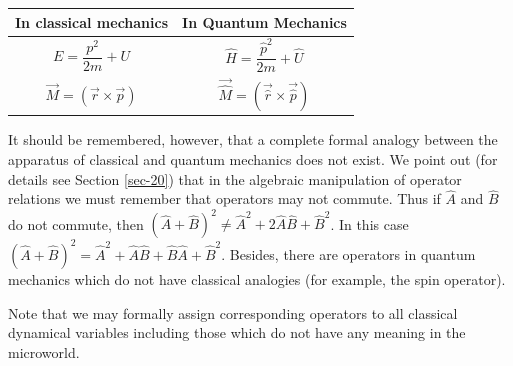\documentclass[a4paper,sfsidenotes,colorlinks=true]{tufte-book}
\numberwithin{equation}{section}
\numberwithin{figure}{section}
\begin{document}
\begin{table}
\begin{tabular}{p{4cm}p{4cm}}
\toprule
\textbf{In classical mechanics} & \textbf{In Quantum Mechanics}\\[3pt]
\midrule
\begin{minipage}{4cm}\begin{equation*} E = \frac{p^{2}}{2m} + U \end{equation*}\end{minipage} & \begin{minipage}{4cm}\begin{equation} \hat{H} = \frac{\hat{p}^{2}}{2m} + \hat{U} \label{eq-19.1}\end{equation}\end{minipage}\\
\begin{minipage}{4cm}\begin{equation*} \vec{M} = \left( \vec{r}
      \times \vec{p} \right) \end{equation*}\end{minipage} & \begin{minipage}{4cm}\begin{equation}  \vec{\hat{M}} = \left( \vec{\hat{r}}
      \times \vec{\hat{p}} \right)  \label{eq-19.2}\end{equation}\end{minipage}\\[5pt]
\bottomrule
\end{tabular}
\label{correspondence-table}
\end{table}

It should be remembered, however, that a complete formal analogy
between the apparatus of classical and quantum mechanics does not
exist. We point out (for details see Section \ref{sec-20}) that in the
algebraic manipulation of operator relations we must remember that
operators may not commute. Thus if $\hat{A}$ and $\hat{B}$ do not
commute, then $\left( \hat{A} + \hat{B} \right)^{2} \ne \hat{A}^{2} + 2 \hat{A}
\hat{B} + \hat{B}^{2}$. In this case $\left( \hat{A} + \hat{B} \right)^{2} =
\hat{A}^{2} +  \hat{A} \hat{B} + \hat{B}\hat{A} +\hat{B}^{2}$. Besides, there are
operators in quantum mechanics which do not have classical analogies
(for example, the spin operator).


Note that we may formally assign corresponding operators to all
classical dynamical variables including those which do not have any
meaning in the microworld.
\end{document}
